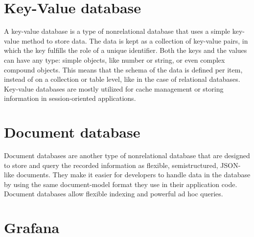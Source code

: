 \section{Key-Value database}


A key-value database is a type of nonrelational database that uses a simple key-value method to store data. The data is kept as a collection of key-value pairs, in which the key fulfills the role of a unique identifier. Both the keys and the values can have any type: simple objects, like number or string, or even complex compound objects. This means that the schema of the data is defined per item, instead of on a collection or table level, like in the case of relational databases. Key-value databases are mostly utilized for cache management or storing information in session-oriented applications. \cite{keyvalue-database-aws}

\section{Document database}


Document databases are another type of nonrelational database that are designed to store and query the recorded information as flexible, semistructured, JSON-like documents. They make it easier for developers to handle data in the database by using the same document-model format they use in their application code. Document databases allow flexible indexing and powerful ad hoc queries. \cite{document-database-aws}



\section{Grafana}

